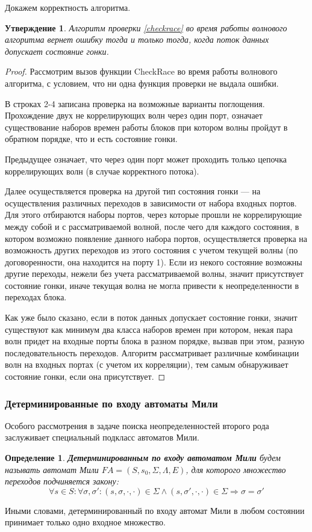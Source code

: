 \documentclass[10pt,a4paper]{article}
\newtheorem{defen}{Определение}
\newtheorem{theorem}{Утверждение}
\newcommand{\FA}{F\!A}
\begin{document}
  Докажем корректность алгоритма.
  \begin{theorem}
    Алгоритм проверки \ref{checkrace} во время работы волнового алгоритма вернет ошибку
    тогда и только тогда, когда поток данных допускает состояние гонки.
  \end{theorem}
  \begin{proof}
    Рассмотрим вызов функции CheckRace во время работы волнового алгоритма, с условием, что ни одна функция проверки не выдала ошибки.
    
    В строках 2-4 записана проверка на возможные варианты поглощения. Прохождение двух не коррелирующих волн через один порт, означает существование наборов времен
    работы блоков при котором волны пройдут в обратном порядке, что и есть состояние гонки.
    
    Предыдущее означает, что через один порт может проходить только цепочка коррелирующих волн (в случае корректного потока).
    
    Далее осуществляется проверка на другой тип состояния гонки --- на осуществления различных переходов в зависимости от набора входных портов.
    Для этого отбираются наборы портов, через которые прошли не коррелирующие между собой и с рассматриваемой волной, после чего для каждого состояния,
    в котором возможно появление данного набора портов, осуществляется проверка на возможность других переходов из этого состояния с учетом текущей волны
    (по договоренности, она находится на порту 1). Если из некого состояние возможны другие переходы, нежели без учета рассматриваемой волны,
    значит присутствует состояние гонки, иначе текущая волна не могла привести к неопределенности в переходах блока.
    
    Как уже было сказано, если в поток данных допускает состояние гонки, значит существуют как минимум два класса наборов времен
    при котором, некая пара волн придет на входные порты блока в разном порядке, вызвав при этом, разную последовательность переходов.
    Алгоритм рассматривает различные комбинации волн на входных портах (с учетом их корреляции), тем самым обнаруживает состояние гонки, если она присутствует.
  \end{proof}
  
  \subsubsection{Детерминированные по входу автоматы Мили}
    Особого рассмотрения в задаче поиска неопределенностей второго рода заслуживает специальный подкласс автоматов Мили.
    \begin{defen}
      \textbf{Детерминированным по входу автоматом Мили} будем называть автомат Мили $\FA = (S, s_0, \Sigma, \Lambda, E)$, для которого
      множество переходов подчиняется закону:
      $$\forall s \in S: \forall \sigma, \sigma': (s, \sigma, \cdot, \cdot) \in \Sigma \wedge (s, \sigma', \cdot, \cdot) \in \Sigma \Rightarrow \sigma = \sigma'$$
    \end{defen}
    Иными словами, детерминированный по входу автомат Мили в любом состоянии принимает только одно входное множество.
    
\end{document}
